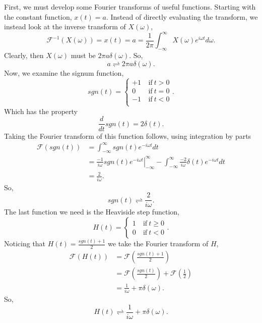 \documentclass[12pt,twocolumn]{article}
\begin{document}
First, we must develop some Fourier transforms of useful functions. Starting with the constant function, $x(t)=a$. Instead of directly evaluating the transform, we instead look at the inverse transform of $X(\omega)$,
\begin{equation*}
\mathcal{F}^{-1}(X(\omega))=x(t)=a=\frac{1}{2\pi}\int_{-\infty}^{\infty}X(\omega)e^{i\omega t}d\omega.
\end{equation*}
Clearly, then $X(\omega)$ must be $2\pi a\delta(\omega)$. So,
\begin{equation}
a\rightleftharpoons 2\pi a\delta(\omega).
\end{equation}
Now, we examine the signum function,
\begin{equation}
\mathit{sgn}(t) =
    \begin{cases}
    +1~&\mathrm{if}~t>0 \\
    0~&\mathrm{if}~t=0  \\
    -1~&\mathrm{if}~t<0 \\
    \end{cases}.
\end{equation}
Which has the property
\begin{equation}
\frac{d}{dt}\mathit{sgn}(t) = 2\delta(t).
\end{equation}
Taking the Fourier transform of this function follows, using integration by parts
\begin{equation*}
\begin{aligned}
\mathcal{F}(\mathit{sgn}(t))&= \int_{-\infty}^{\infty}\mathit{sgn}(t)e^{-i\omega t}dt \\
&= \left.\frac{-1}{i\omega}\mathit{sgn}(t)e^{-i\omega t}\right|_{-\infty}^{\infty} - \int_{-\infty}^{\infty}\frac{-2}{i\omega}\delta(t)e^{-i\omega t}dt \\
&= \frac{2}{i\omega}.
\end{aligned}
\end{equation*}
So,
\begin{equation}
\mathit{sgn}(t)\rightleftharpoons\frac{2}{i\omega}.
\end{equation}
The last function we need is the Heaviside step function,
\begin{equation}
H(t) =
    \begin{cases}
    1~&\mathrm{if}~t\geq0 \\
    0~&\mathrm{if}~t<0
    \end{cases}.
\end{equation}
Noticing that $H(t)=\frac{\mathit{sgn}(t)+1}{2}$ we take the Fourier transform of $H$,
\begin{equation*}
\begin{aligned}
\mathcal{F}(H(t))&=\mathcal{F}\left(\frac{\mathit{sgn}(t)+1}{2}\right) \\
&=\mathcal{F}\left(\frac{\mathit{sgn}(t)}{2}\right)+\mathcal{F}\left(\frac{1}{2}\right) \\
&= \frac{1}{i\omega}+\pi\delta(\omega).
\end{aligned}
\end{equation*}
So,
\begin{equation}
H(t)\rightleftharpoons\frac{1}{i\omega}+\pi\delta(\omega).
\end{equation}
\end{document}
